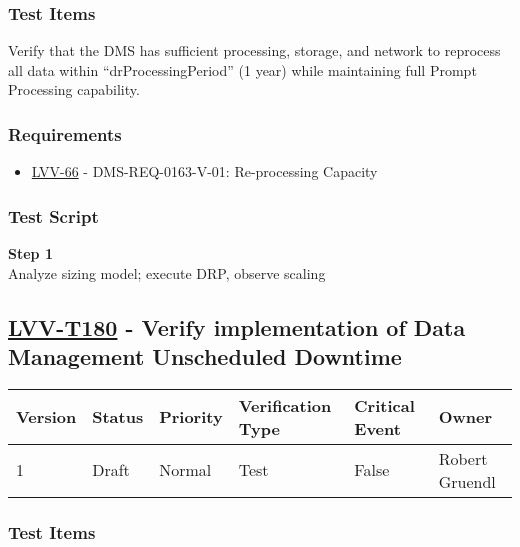 \subsubsection{Test Items}\label{test-items-38}

Verify that the DMS has sufficient processing, storage, and network to
reprocess all data within ``drProcessingPeriod'' (1 year) while
maintaining full Prompt Processing capability.

\subsubsection{Requirements}\label{requirements-38}

\begin{itemize}
\tightlist
\item
  \href{https://jira.lsstcorp.org/browse/LVV-66}{LVV-66} -
  DMS-REQ-0163-V-01: Re-processing Capacity
\end{itemize}

\subsubsection{Test Script}\label{test-script-38}

\textbf{Step 1}\\
\hspace*{0.333em}Analyze sizing model; execute DRP, observe
scaling\\[2\baselineskip]

\hypertarget{lvv-t180---verify-implementation-of-data-management-unscheduled-downtime}{\subsection{\texorpdfstring{\href{https://jira.lsstcorp.org/secure/Tests.jspa\#/testCase/LVV-T180}{LVV-T180}
- Verify implementation of Data Management Unscheduled
Downtime}{LVV-T180 - Verify implementation of Data Management Unscheduled Downtime}}\label{lvv-t180---verify-implementation-of-data-management-unscheduled-downtime}}

\begin{longtable}[]{@{}llllll@{}}
\toprule
Version & Status & Priority & Verification Type & Critical Event &
Owner\tabularnewline
\midrule
\endhead
1 & Draft & Normal & Test & False & Robert Gruendl\tabularnewline
\bottomrule
\end{longtable}

\subsubsection{Test Items}\label{test-items-39}

